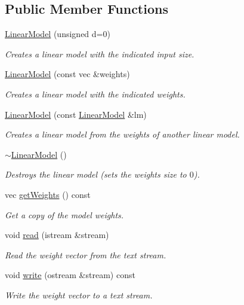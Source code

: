 \subsection*{Public Member Functions}
\begin{DoxyCompactItemize}
\item 
\hyperlink{classhappyml_1_1LinearModel_a6d26af3c2b81bcd0fe08c5e23d90d5a7}{Linear\+Model} (unsigned d=0)
\begin{DoxyCompactList}\small\item\em Creates a linear model with the indicated input size. \end{DoxyCompactList}\item 
\hyperlink{classhappyml_1_1LinearModel_a6954d769ddfab54858045055a808d3dc}{Linear\+Model} (const vec \&weights)
\begin{DoxyCompactList}\small\item\em Creates a linear model with the indicated weights. \end{DoxyCompactList}\item 
\hyperlink{classhappyml_1_1LinearModel_a4670005cb3a41b6f600e4742cfbfb43c}{Linear\+Model} (const \hyperlink{classhappyml_1_1LinearModel}{Linear\+Model} \&lm)
\begin{DoxyCompactList}\small\item\em Creates a linear model from the weights of another linear model. \end{DoxyCompactList}\item 
\hyperlink{classhappyml_1_1LinearModel_a14d0bf3258e08f2f8974db865181741c}{$\sim$\+Linear\+Model} ()
\begin{DoxyCompactList}\small\item\em Destroys the linear model (sets the weights size to $0$). \end{DoxyCompactList}\item 
vec \hyperlink{classhappyml_1_1LinearModel_a22958325c41969e10fb72375eb9174a3}{get\+Weights} () const 
\begin{DoxyCompactList}\small\item\em Get a copy of the model weights. \end{DoxyCompactList}\item 
void \hyperlink{classhappyml_1_1LinearModel_abdc75a19c7234d8bc13b4dd7ad621c9e}{read} (istream \&stream)
\begin{DoxyCompactList}\small\item\em Read the weight vector from the text stream. \end{DoxyCompactList}\item 
void \hyperlink{classhappyml_1_1LinearModel_ad788fb6f13ba64d8164a89a8be96949d}{write} (ostream \&stream) const 
\begin{DoxyCompactList}\small\item\em Write the weight vector to a text stream. \end{DoxyCompactList}\end{DoxyCompactItemize}
